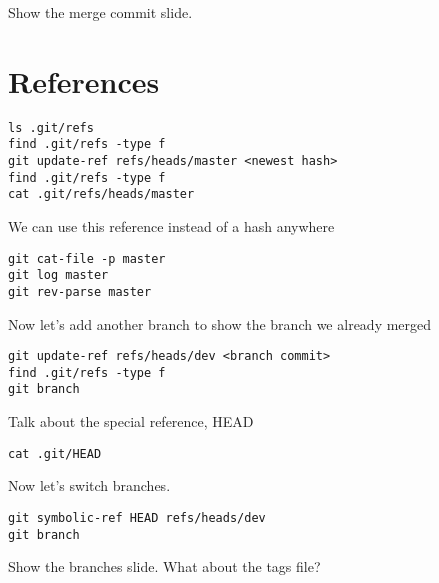 \documentclass[a4paper,12pt]{article}
\begin{document}
\vspace{0.1in}

Show the merge commit slide.

\section*{References}

\texttt{ls .git/refs\\
find .git/refs -type f\\
git update-ref refs/heads/master <newest hash>\\
find .git/refs -type f\\
cat .git/refs/heads/master}

\vspace{0.1in}

We can use this reference instead of a hash anywhere

\vspace{0.1in}

\texttt{git cat-file -p master\\
git log master\\
git rev-parse master}

\vspace{0.1in}

Now let's add another branch to show the branch we already merged

\vspace{0.1in}

\texttt{git update-ref refs/heads/dev <branch commit>\\
find .git/refs -type f\\
git branch}

\vspace{0.1in}

Talk about the special reference, HEAD

\vspace{0.1in}

\texttt{cat .git/HEAD}

\vspace{0.1in}

Now let's switch branches.

\vspace{0.1in}

\texttt{git symbolic-ref HEAD refs/heads/dev\\
git branch}

\vspace{0.1in}

Show the branches slide. What about the tags file?
\end{document}
